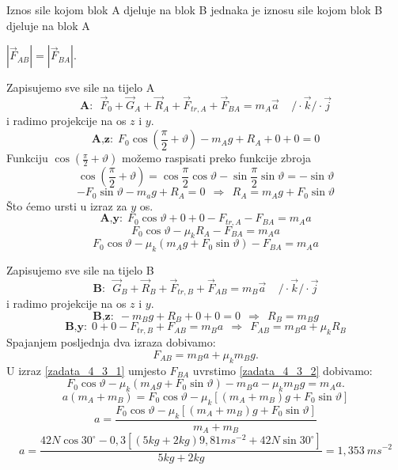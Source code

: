 


Iznos sile kojom blok A djeluje na blok B jednaka je iznosu sile kojom blok B djeluje na blok A 

$|\vec{F}_{AB}|=|\vec{F}_{BA}|$.

Zapisujemo sve sile na tijelo A
$$ \textbf{A:}\ \ \ \vec{F}_0+\vec{G}_A+\vec{R}_A + \vec{F}_{tr,A}+\vec{F}_{BA}=m_A\vec{a} \ \ \ \ \  /\cdot\vec{k}/\cdot\vec{j}$$
i radimo projekcije na os $z$ i $y$.
$$  \textbf{A,z:}\ \ F_0\cos(\frac{\pi}{2}+\vartheta)-m_Ag+R_A+0+0=0  $$
Funkciju $\cos(\frac{\pi}{2}+\vartheta)$ možemo raspisati preko funkcije zbroja
$$\cos(\frac{\pi}{2}+\vartheta)=\cos\frac{\pi}{2}\cos\vartheta-\sin\frac{\pi}{2}\sin\vartheta=-\sin\vartheta $$
$$-F_0\sin\vartheta-m_ag+R_A=0\ \ \Rightarrow\ \ R_A=m_Ag+F_0\sin\vartheta $$
Što ćemo ursti u izraz za $y$ os.
$$  \textbf{A,y:}\ \ F_0\cos\vartheta+0 +0 -F_{tr,A}- F_{BA}=m_Aa   $$
$$ F_0\cos\vartheta -\mu_kR_A- F_{BA}=m_Aa  $$
\begin{equation}
  F_0\cos\vartheta -\mu_k(m_Ag+F_0\sin\vartheta)- F_{BA}=m_Aa
  \label{zadata_4_3_1}
\end{equation}

Zapisujemo sve sile na tijelo B
$$ \textbf{B:}\ \ \ \vec{G}_B+\vec{R}_B + \vec{F}_{tr,B}+\vec{F}_{AB}=m_B\vec{a} \ \ \ \ \  /\cdot\vec{k}/\cdot\vec{j}$$
i radimo projekcije na os $z$ i $y$.
$$  \textbf{B,z:}\ \ -m_Bg+R_B+0+0=0  \ \ \Rightarrow\ \ R_B=m_Bg $$
$$  \textbf{B,y:}\ \ 0+0-F_{tr,B}+F_{AB}=m_Ba  \ \ \Rightarrow\ \ F_{AB}=m_Ba+\mu_kR_B$$
Spajanjem posljednja dva izraza dobivamo:
\begin{equation}
 F_{AB}=m_Ba+\mu_km_Bg.
  \label{zadata_4_3_2}
\end{equation}
U izraz \ref{zadata_4_3_1} umjesto $F_{BA}$ uvrstimo \ref{zadata_4_3_2} dobivamo:
$$  F_0\cos\vartheta -\mu_k(m_Ag+F_0\sin\vartheta)- m_Ba-\mu_km_Bg=m_Aa. $$
$$ a(m_A+m_B)= F_0\cos\vartheta -\mu_k\left[(m_A+ m_B)g+F_0\sin\vartheta\right]$$
$$ a= \frac{F_0\cos\vartheta -\mu_k\left[(m_A+ m_B)g+F_0\sin\vartheta\right]}{m_A+m_B}$$
$$ a= \frac{42N\cos30^\circ -0,3\left[(5kg+2kg)9,81ms^{-2}+42N\sin30^\circ\right]}{5kg+2kg}= 1,353\ ms^{-2}$$








